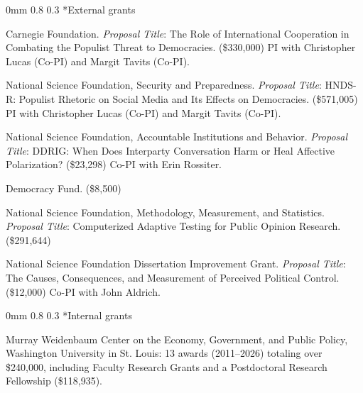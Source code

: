 \documentclass[10pt]{article}
\makeatletter
\renewcommand{\subsection}{\@startsection{subsection}{2}
{0mm}
{0.8\baselineskip}
{0.3\baselineskip}
{\normalsize\scshape}}
\renewenvironment{CV}
  {\begin{list}{}
    {\renewcommand{\makelabel}{\entrylabel}
    \setlength{\labelwidth}{55pt}
    \setlength{\leftmargin}{62pt}
  }}
  {\end{list}}
\makeatother
\begin{document}
\subsection*{External grants}
\begin{CV}

\item[2023] Carnegie Foundation.
  \emph{Proposal Title}: The Role of International Cooperation in Combating the Populist Threat to Democracies. (\$330,000) PI with Christopher Lucas (Co-PI) and
  Margit Tavits (Co-PI).
  
\item[2022] National Science Foundation, Security and Preparedness.
  \emph{Proposal Title}: HNDS-R: Populist Rhetoric on Social Media and
  Its Effects on Democracies. (\$571,005) PI with Christopher Lucas (Co-PI) and
  Margit Tavits (Co-PI).
  
\item[2020] National Science Foundation, Accountable Institutions and
  Behavior. \emph{Proposal Title}: DDRIG: When Does Interparty
  Conversation Harm or Heal Affective Polarization? (\$23,298) Co-PI
  with Erin Rossiter.
  
 \item[2018] Democracy Fund.  (\$8,500)

\item[2016] National Science Foundation, Methodology, Measurement, and Statistics. \emph{Proposal Title}: Computerized Adaptive Testing for Public Opinion Research. (\$291,644)

\item[2010] National Science Foundation Dissertation Improvement Grant. \emph{Proposal Title}: The Causes, Consequences, and
  Measurement of Perceived Political Control. (\$12,000) Co-PI with
  John Aldrich.

\end{CV}



\subsection*{Internal grants}

\noindent Murray Weidenbaum Center on the Economy, Government, and Public Policy, Washington University in St. Louis: 13 awards (2011--2026) totaling over \$240,000, including Faculty Research Grants and a Postdoctoral Research Fellowship (\$118,935).
\end{document}
